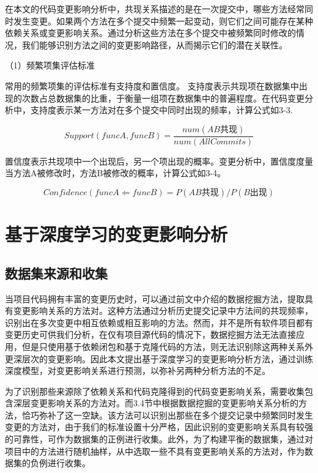 在本文的代码变更影响分析中，共现关系描述的是在一次提交中，哪些方法经常同时发生变更。如果两个方法在多个提交中频繁一起变动，则它们之间可能存在某种依赖关系或变更影响关系。通过分析这些方法在多个提交中被频繁同时修改的情况，我们能够识别方法之间的变更影响路径，从而揭示它们的潜在关联性。

（1）频繁项集评估标准

常用的频繁项集的评估标准有支持度和置信度。
支持度表示共现项在数据集中出现的次数占总数据集的比重，于衡量一组项在数据集中的普遍程度。在代码变更分析中，支持度表示某一方法对在多个提交中同时出现的频率，计算公式如3-3.

\begin{equation}
Support(funcA,funcB)=\frac{num(AB共现)}{num(AllCommits)}
\end{equation}

置信度表示共现项中一个出现后，另一个项出现的概率。变更分析中，置信度度量当方法A被修改时，方法B被修改的概率，计算公式如3-4。

\begin{equation}
Confidence(funcA\Leftarrow funcB)=P(AB共现)/P(B出现)
\end{equation}


\section{基于深度学习的变更影响分析}

\subsection{数据集来源和收集}

当项目代码拥有丰富的变更历史时，可以通过前文中介绍的数据挖掘方法，提取具有变更影响关系的方法对。这种方法通过分析历史提交记录中方法间的共现频率，识别出在多次变更中相互依赖或相互影响的方法。然而，并不是所有软件项目都有变更历史可供我们分析，在仅有项目源代码的情况下，数据挖掘方法无法直接应用，但是只使用基于依赖闭包和基于克隆代码的方法，则无法识别除这两种关系外更深层次的变更影响。因此本文提出基于深度学习的变更影响分析方法，通过训练深度模型，对变更影响关系进行预测，以弥补另两种分析方法的不足。

为了识别那些来源除了依赖关系和代码克隆得到的代码变更影响关系，需要收集包含深层变更影响关系的方法对。而3.4节中根据数据挖掘的变更影响关系分析的方法，恰巧弥补了这一空缺。该方法可以识别出那些在多个提交记录中频繁同时发生变更的方法对，由于我们的标准设置十分严格，因此识别的变更影响关系具有较强的可靠性，可作为数据集的正例进行收集。此外，为了构建平衡的数据集，通过对项目中的方法进行随机抽样，从中选取一些不具有变更影响关系的方法对，作为数据集的负例进行收集。

